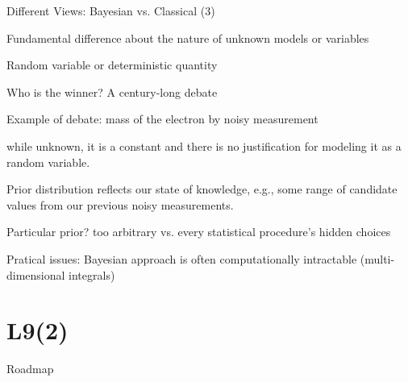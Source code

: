 \begin{frame}{Different Views: Bayesian vs. Classical (3)}


\plitemsep 0.1in
\bci
\item Fundamental difference about the nature of unknown models or variables

\item Random variable or deterministic quantity 

\item Who is the winner? A century-long debate 
  
\item Example of debate: mass of the electron by noisy measurement
  \bci
\item {} while unknown, it is a constant and there is no
  justification for modeling it as a random variable. 
  
\item {}  Prior distribution reflects our state of knowledge,
  e.g., some range of candidate values from our previous noisy
  measurements. 
  \eci

\item Particular prior? too arbitrary vs. every statistical
  procedure's hidden choices  

\item Pratical issues: Bayesian approach is often computationally
  intractable (multi-dimensional integrals)

  \eci


\end{frame}


\section{L9(2)}
\begin{frame}{Roadmap}

\plitemsep 0.15in

\bce[(1)]

\item {}

\item {}

\item {}



  
  \ece

\end{frame}


